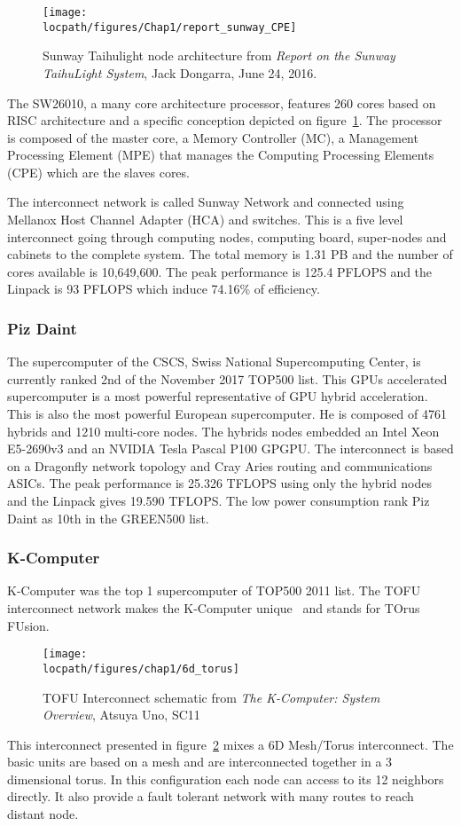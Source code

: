 \begin{figure}
\centering
\texttt{[image: \\locpath/figures/Chap1/report\_sunway\_CPE]}
\caption{Sunway Taihulight node architecture from \textit{Report on the Sunway TaihuLight System}, Jack Dongarra, June 24, 2016.}
\label{fig:chap1_report_sunway_CPE}
\end{figure}

The SW26010, a many core architecture processor, features 260 cores based on RISC architecture and a specific conception depicted on figure~\ref{fig:chap1_report_sunway_CPE}. 
The processor is composed of the master core, a Memory Controller (MC), a Management Processing Element (MPE) that manages the Computing Processing Elements (CPE) which are the slaves cores. 

The interconnect network is called Sunway Network and connected using Mellanox Host Channel Adapter (HCA) and switches. 
This is a five level interconnect going through computing nodes, computing board, super-nodes and cabinets to the complete system.
The total memory is 1.31 PB and the number of cores available is 10,649,600.
The peak performance is 125.4 PFLOPS and the Linpack is 93 PFLOPS which induce 74.16\% of efficiency. 

\subsubsection{Piz Daint}
The supercomputer of the CSCS, Swiss National Supercomputing Center, is currently ranked 2nd of the November 2017 TOP500 list. 
This GPUs accelerated supercomputer is a most powerful representative of GPU hybrid acceleration.
This is also the most powerful European supercomputer. 
He is composed of 4761 hybrids and 1210 multi-core nodes. 
The hybrids nodes embedded an Intel Xeon E5-2690v3 and an NVIDIA Tesla Pascal P100 GPGPU. 
The interconnect is based on a Dragonfly network topology and Cray Aries routing and communications ASICs. 
The peak performance is 25.326 TFLOPS using only the hybrid nodes and the Linpack gives 19.590 TFLOPS.
The low power consumption rank Piz Daint as 10th in the GREEN500 list. 

\subsubsection{K-Computer}
K-Computer was the top 1 supercomputer of TOP500 2011 list. 
The TOFU interconnect network makes the K-Computer unique~\cite{ajima2009tofu} and stands for TOrus FUsion.
\begin{figure}
\begin{center}
\texttt{[image: \\locpath/figures/chap1/6d\_torus]}
\end{center}
\caption{TOFU Interconnect schematic from \textit{The K-Computer: System Overview}, Atsuya Uno, SC11}
\label{fig:1_HPC:tofu}
\end{figure}
This interconnect presented in figure~\ref{fig:1_HPC:tofu} mixes a 6D Mesh/Torus interconnect.
The basic units are based on a mesh and are interconnected together in a 3 dimensional torus. 
In this configuration each node can access to its 12 neighbors directly. 
It also provide a fault tolerant network with many routes to reach distant node. 

